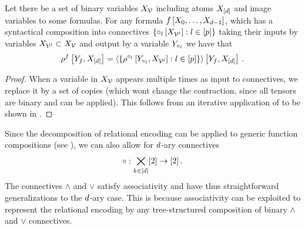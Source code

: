 \begin{theorem}\label{the:compositionByContraction}
	Let there be a set of binary variables $X_{\mathcal{V}}$ including atoms $X_{[d]}$ and image variables to some formulas.
	For any formula $f\left[X_{0},\ldots,X_{d-1}\right]$, which has a syntactical composition into connectives $\{\circ_{l}\left[X_{\mathcal{V}^{l}}\right] : l\in[p]\}$ taking their inputs by variables $X_{\mathcal{V}^{l}}\subset X_{\mathcal{V}}$ and output by a variable $Y_{\circ_{l}}$
	we have that
	\begin{align*}
		\rho^{f}\left[Y_{f},X_{[d]}\right] =
		\left\langle \left\{
		\rho^{\circ_{l}}\left[Y_{\circ_{l}},X_{\mathcal{V}^{l}}\right] : l\in[p]
		\right\} \right\rangle \left[ Y_{f},X_{[d]} \right] \, . 
	\end{align*}
\end{theorem}
\begin{proof}
	When a variable in $X_{\mathcal{V}}$ appears multiple times as input to connectives, we replace it by a set of copies (which wont change the contraction, since all tensors are binary and  can be applied).
	This follows from an iterative application of  to be shown in .
\end{proof}

\begin{remark}\label{rem:naryConnectives}
	Since the decomposition of relational encoding can be applied to generic function compositions (see ), we can also allow for $d$-ary connectives
		\[ \circ : \bigtimes_{k\in[d]} [2] \rightarrow [2] \, . \]
	The connectives $\land$ and $\lor$ satisfy associativity and have thus straightforward generalizations to the $d$-ary case.
	This is because associativity can be exploited to represent the relational encoding by any tree-structured composition of binary $\land$ and $\lor$ connectives.
\end{remark}


